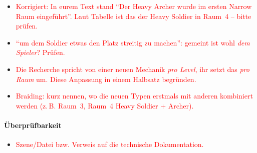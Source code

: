 \documentclass[../Main.tex]{subfiles}
\begin{document}
\begin{itemize}[leftmargin=1.5cm]
    \item \textcolor{red}{Korrigiert: In eurem Text stand \enquote{Der Heavy Archer wurde im ersten Narrow Raum eingeführt}. Laut Tabelle ist das der Heavy Soldier in Raum~4 -- bitte prüfen.}
    \item \textcolor{red}{\enquote{um dem Soldier etwas den Platz streitig zu machen}: gemeint ist wohl \emph{dem Spieler}? Prüfen.}
    \item \textcolor{red}{Die Recherche spricht von einer neuen Mechanik \emph{pro Level}, ihr setzt das \emph{pro Raum} um. Diese Anpassung in einem Halbsatz begründen.}
    \item \textcolor{red}{Braiding: kurz nennen, wo die neuen Typen erstmals mit anderen kombiniert werden (z.\,B. Raum~3, Raum~4 Heavy Soldier + Archer).}
\end{itemize}

\paragraph{Überprüfbarkeit}
\begin{itemize}[leftmargin=1.5cm]
    \item \textcolor{red}{Szene/Datei bzw. Verweis auf die technische Dokumentation.}
\end{itemize}
\end{document}
